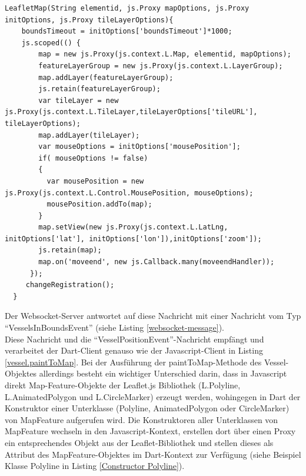 \begin{lstlisting}[caption=Konstruktor des LeafletMap-Objektes mit Zugriff auf den Javascript-Kontext, label=LeafletMapConstructor]
LeafletMap(String elementid, js.Proxy mapOptions, js.Proxy initOptions, js.Proxy tileLayerOptions){
    boundsTimeout = initOptions['boundsTimeout']*1000;
    js.scoped(() {
        map = new js.Proxy(js.context.L.Map, elementid, mapOptions);
        featureLayerGroup = new js.Proxy(js.context.L.LayerGroup);
        map.addLayer(featureLayerGroup);
        js.retain(featureLayerGroup);
        var tileLayer = new js.Proxy(js.context.L.TileLayer,tileLayerOptions['tileURL'], tileLayerOptions);
        map.addLayer(tileLayer);
        var mouseOptions = initOptions['mousePosition'];
        if( mouseOptions != false)
        {
          var mousePosition = new js.Proxy(js.context.L.Control.MousePosition, mouseOptions);
          mousePosition.addTo(map);
        }
        map.setView(new js.Proxy(js.context.L.LatLng, initOptions['lat'], initOptions['lon']),initOptions['zoom']);
        js.retain(map);
        map.on('moveend', new js.Callback.many(moveendHandler));
      });
     changeRegistration();
  }
\end{lstlisting}
Der Websocket-Server antwortet auf diese Nachricht mit einer Nachricht vom Typ “VesselsInBoundsEvent” (siehe Listing \ref{websocket-message}).\\
Diese Nachricht und die “VesselPositionEvent”-Nachricht empfängt und verarbeitet der Dart-Client genauso wie der Javascript-Client in Listing \ref{vessel.paintToMap}. Bei der Ausführung der paintToMap-Methode des Vessel-Objektes allerdings besteht ein wichtiger Unterschied darin, dass in Javascript direkt Map-Feature-Objekte der Leaflet.js Bibliothek (L.Polyline, L.AnimatedPolygon und L.CircleMarker) erzeugt werden, wohingegen in Dart der Konstruktor einer Unterklasse (Polyline, AnimatedPolygon oder CircleMarker) von MapFeature aufgerufen wird. Die Konstruktoren aller Unterklassen von MapFeature wechseln in den Javascript-Kontext, erstellen dort über einen Proxy ein entsprechendes Objekt aus der Leaflet-Bibliothek und stellen dieses als Attribut des MapFeature-Objektes im Dart-Kontext zur Verfügung (siehe Beispiel Klasse Polyline in Listing \ref{Constructor Polyline}).

